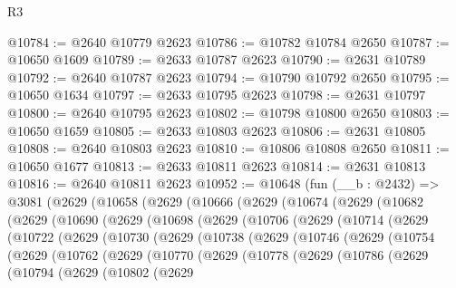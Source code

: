 \begin{lexlean}{R3}
\begin{coremodule}
@10784 := @2640 @10779 @2623
@10786 := @10782 @10784 @2650
@10787 := @10650 @1609
@10789 := @2633 @10787 @2623
@10790 := @2631 @10789
@10792 := @2640 @10787 @2623
@10794 := @10790 @10792 @2650
@10795 := @10650 @1634
@10797 := @2633 @10795 @2623
@10798 := @2631 @10797
@10800 := @2640 @10795 @2623
@10802 := @10798 @10800 @2650
@10803 := @10650 @1659
@10805 := @2633 @10803 @2623
@10806 := @2631 @10805
@10808 := @2640 @10803 @2623
@10810 := @10806 @10808 @2650
@10811 := @10650 @1677
@10813 := @2633 @10811 @2623
@10814 := @2631 @10813
@10816 := @2640 @10811 @2623
@10952 := @10648
    (fun (__b : @2432) =>
    @3081
      (@2629
        (@10658
          (@2629
            (@10666
              (@2629
                (@10674
                  (@2629
                    (@10682
                      (@2629
                        (@10690
                          (@2629
                            (@10698
                              (@2629
                                (@10706
                                  (@2629
                                    (@10714
                                      (@2629
                                        (@10722
                                          (@2629
                                            (@10730
                                              (@2629
                                                (@10738
                                                  (@2629
                                                    (@10746
                                                      (@2629
                                                        (@10754
                                                          (@2629
                                                            (@10762
                                                              (@2629
                                                                (@10770
                                                                  (@2629
                                                                    (@10778
                                                                      (@2629
                                                                        (@10786
                                                                          (@2629
                                                                            (@10794
                                                                              (@2629
                                                                                (@10802
                                                                                  (@2629

\end{coremodule}
\end{lexlean}
